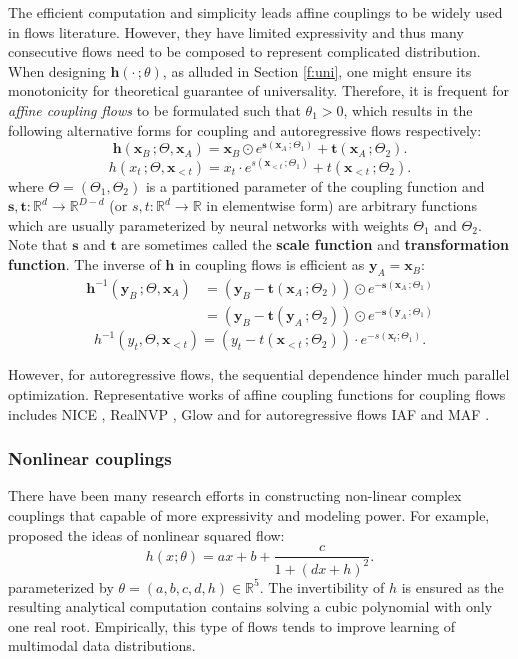 The efficient computation and simplicity leads affine couplings to be widely
used in flows literature. However, they have limited expressivity and thus
many consecutive flows need to be composed to represent complicated
distribution. When designing $\mathbf{h}(\cdot\,;\theta)$, as alluded in Section
\ref{f:uni}, one might ensure its monotonicity for theoretical guarantee of
universality. Therefore, it is frequent for \textit{affine coupling
flows} to be formulated such that $\theta_1 > 0$, which results in the following alternative forms for coupling and autoregressive flows respectively:
$$
\mathbf{h}(\mathbf{x}_B\,;\Theta, \mathbf{x}_A) = \mathbf{x}_B \odot e^{\mathbf{s}(\mathbf{x}_A\,;\Theta_1)} +
\mathbf{t}(\mathbf{x}_A\,;\Theta_2)
.$$
$$
h(x_t\,;\Theta, \mathbf{x}_{<t}) = x_t \cdot e^{s(\mathbf{x}_{<t}\,;\Theta_1)} +
t(\mathbf{x}_{<t}\,;\Theta_2)
.$$
where $\Theta = (\Theta_1, \Theta_2)$ is a partitioned parameter of the
coupling function and $\mathbf{s}, \mathbf{t}: \mathbb{R}^d \to \mathbb{R}^{D-d}$
(or $s, t: \mathbb{R}^d \to \mathbb{R}$ in elementwise form) are
arbitrary functions which are usually parameterized by neural networks with
weights $\Theta_1$ and $\Theta_2$.
Note that $\mathbf{s}$ and $\mathbf{t}$ are sometimes called the \textbf{scale
function} and \textbf{transformation function}. The inverse of $\mathbf{h}$ in coupling flows is
efficient as $\mathbf{y}_A = \mathbf{x}_B$:
\begin{align*}
  \mathbf{h}^{-1}(\mathbf{y}_B\,;\Theta, \mathbf{x}_A)
  &= (\mathbf{y}_B - \mathbf{t}(\mathbf{x}_A\,;\Theta_2)) \odot
  e^{-\mathbf{s}(\mathbf{x}_A\,;\Theta_1)} \\
  &= (\mathbf{y}_B -
  \mathbf{t}(\mathbf{y}_A\,;\Theta_2)) \odot e^{-\mathbf{s}(\mathbf{y}_A\,;\Theta_1)}
\end{align*}
$$
  h^{-1}(y_t, \Theta, \mathbf{x}_{<t}) = (y_t - t(\mathbf{x}_{<t}\,;\Theta_2)) \cdot
  e^{-s(\mathbf{x}_{t}; \Theta_1)}
.$$

However, for autoregressive flows, the sequential dependence hinder much parallel
optimization. Representative works of affine coupling functions for coupling flows includes NICE \cite{dinhNICENonlinearIndependent2015}, RealNVP
\cite{dinhDensityEstimationUsing2017}, Glow
\cite{kingmaGlowGenerativeFlow2018} and for autoregressive flows IAF
\cite{kingmaImprovedVariationalInference2016} and MAF
\cite{papamakariosMaskedAutoregressiveFlow2017}.

\subsubsection{Nonlinear couplings}
There have been many research efforts in constructing non-linear complex
couplings that capable of more expressivity and modeling power. For example,
\cite{zieglerLatentNormalizingFlows2019} proposed the ideas of nonlinear squared
flow:
$$
h(x;\theta) = ax + b + \frac{c}{1+(dx+h)^2}
.$$
parameterized by $\theta = (a,b,c,d,h) \in \mathbb{R}^5$. The invertibility of
$h$ is ensured as the resulting analytical computation contains solving a cubic
polynomial with only one real root. Empirically, this type of flows tends to
improve learning of multimodal data distributions.

